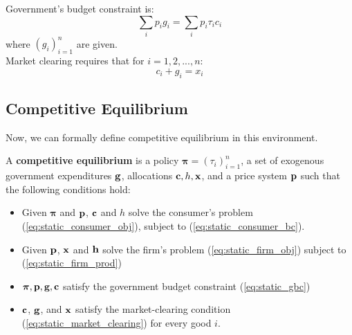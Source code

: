 \documentclass[12pt]{article}
\begin{document}
	\noindent
	Government's budget constraint is:
	\begin{equation} \label{eq:static_gbc}
		\sum_{i} p_ig_i = \sum_{i} p_i \tau_i c_i
	\end{equation}
	where $(g_i)_{i=1}^n$ are given.\\
	
	\noindent
	Market clearing requires that for $i=1, 2, ..., n$:
	\begin{equation} \label{eq:static_market_clearing}
		c_i + g_i = x_i
	\end{equation}
	
	\subsection{Competitive Equilibrium}
	Now, we can formally define competitive equilibrium in this environment.
	\begin{definition}
			A \textbf{competitive equilibrium} is a policy $\boldsymbol{\pi} = (\tau_i)_{i=1}^n$, a set of exogenous government expenditures $\bold{g}$, allocations $\bold{c}, h, \bold{x}$, and a price system $\bold{p}$ such that the following conditions hold:
		\begin{itemize}
				\item Given $\boldsymbol{\pi}$ and $\bold{p}$, $\bold{c}$ and $h$ solve the consumer's problem (\ref{eq:static_consumer_obj}), subject to (\ref{eq:static_consumer_bc}).
			\item Given $\bold{p}$, $\bold{x}$ and $\bold{h}$ solve the firm's problem (\ref{eq:static_firm_obj}) subject to (\ref{eq:static_firm_prod})
			\item $\boldsymbol{\pi}, \bold{p}, \bold{g}, \bold{c}$ satisfy the government budget constraint (\ref{eq:static_gbc})
				\item $\bold{c}$, $\bold{g}$, and $\bold{x}$ satisfy the market-clearing condition (\ref{eq:static_market_clearing}) for every good $i$.
		\end{itemize}
	\end{definition}
	
\end{document}
